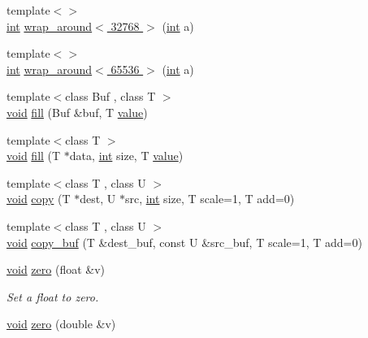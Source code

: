 \begin{DoxyCompactItemize}
\item 
{\footnotesize template$<$$>$ }\\\hyperlink{tk_8h_a83f82f76e7fed06f4c49d2db94028a6d}{int} \hyperlink{namespacedsp_a8ef32631a87fdfa248e2e676aa61b87c}{wrap\+\_\+around$<$ 32768 $>$} (\hyperlink{tk_8h_a83f82f76e7fed06f4c49d2db94028a6d}{int} a)
\item 
{\footnotesize template$<$$>$ }\\\hyperlink{tk_8h_a83f82f76e7fed06f4c49d2db94028a6d}{int} \hyperlink{namespacedsp_aee3af6bac39ed962e4302079feeebb5f}{wrap\+\_\+around$<$ 65536 $>$} (\hyperlink{tk_8h_a83f82f76e7fed06f4c49d2db94028a6d}{int} a)
\item 
{\footnotesize template$<$class Buf , class T $>$ }\\\hyperlink{tk_8h_aba408b7cd755a96426e004c015f5de8e}{void} \hyperlink{namespacedsp_aea548b3e98c1b00c7e87bd247acc9c91}{fill} (Buf \&buf, T \hyperlink{tk_8h_a177a0765f574ef6642002696d9cd82d0}{value})
\item 
{\footnotesize template$<$class T $>$ }\\\hyperlink{tk_8h_aba408b7cd755a96426e004c015f5de8e}{void} \hyperlink{namespacedsp_aedf562a51ab2e66798edf93f97d6b4f5}{fill} (T $\ast$data, \hyperlink{tk_8h_a83f82f76e7fed06f4c49d2db94028a6d}{int} size, T \hyperlink{tk_8h_a177a0765f574ef6642002696d9cd82d0}{value})
\item 
{\footnotesize template$<$class T , class U $>$ }\\\hyperlink{tk_8h_aba408b7cd755a96426e004c015f5de8e}{void} \hyperlink{namespacedsp_a345378c56f45236d32e2ed7f1e981b0d}{copy} (T $\ast$dest, U $\ast$src, \hyperlink{tk_8h_a83f82f76e7fed06f4c49d2db94028a6d}{int} size, T scale=1, T add=0)
\item 
{\footnotesize template$<$class T , class U $>$ }\\\hyperlink{tk_8h_aba408b7cd755a96426e004c015f5de8e}{void} \hyperlink{namespacedsp_a7b81ab9f4ef95d1e9778855ded3cf830}{copy\+\_\+buf} (T \&dest\+\_\+buf, const U \&src\+\_\+buf, T scale=1, T add=0)
\item 
\hyperlink{tk_8h_aba408b7cd755a96426e004c015f5de8e}{void} \hyperlink{namespacedsp_a3c28527ad9c78172345c5ff2175d2e1b}{zero} (float \&v)
\begin{DoxyCompactList}\small\item\em Set a float to zero. \end{DoxyCompactList}\item 
\hyperlink{tk_8h_aba408b7cd755a96426e004c015f5de8e}{void} \hyperlink{namespacedsp_a61fb61ea0337243a287f6065184d0434}{zero} (double \&v)

\end{DoxyCompactItemize}
